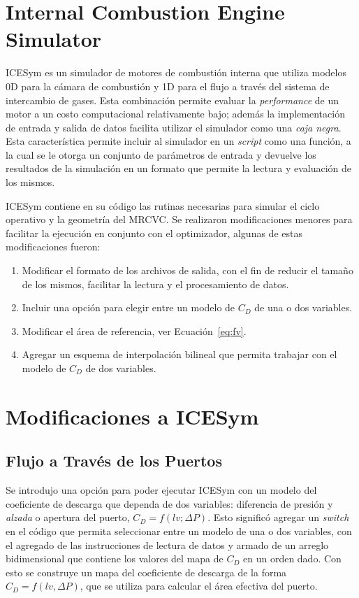 \section{Internal Combustion Engine Simulator}
%
ICESym es un simulador de motores de combustión interna que  utiliza modelos 0D
para la cámara de combustión y 1D para el flujo a través del sistema de
intercambio de gases.
%
Esta combinación permite evaluar la \emph{performance} de un motor a un costo
computacional relativamente bajo; además la implementación de entrada y salida
de datos facilita utilizar el simulador como una \emph{caja negra}.
%
Esta característica permite incluir al simulador en un \emph{script} como una
función, a la cual se le otorga un conjunto de parámetros de entrada y devuelve
los resultados de la simulación en un formato que permite la lectura y
evaluación de los mismos.

ICESym contiene en su código las rutinas necesarias para simular el ciclo
operativo y la geometría del MRCVC.
%
Se realizaron modificaciones menores para facilitar la ejecución en conjunto con
el optimizador, algunas de estas modificaciones fueron:
%
\begin{enumerate}
    \item Modificar el formato de los archivos de salida, con el fin de reducir
el tamaño de los mismos, facilitar la lectura y el procesamiento de datos.
    \item Incluir una opción para elegir entre un modelo de $C_D$ de una o dos
variables.
    \item Modificar el área de referencia, ver Ecuación~\ref{eq:fv}.
    \item Agregar un esquema de interpolación bilineal que permita trabajar con
el modelo de $C_{D}$ de dos variables.
\end{enumerate}


\section{Modificaciones a ICESym}
\subsection{Flujo a Través de los Puertos}
%
Se introdujo una opción para poder ejecutar ICESym con un modelo del coeficiente
de descarga que dependa de dos variables: diferencia de presión y \emph{alzada}
o apertura del puerto, $C_D = f(lv; \Delta P)$.
%
Esto significó agregar un \emph{switch} en el código que permita seleccionar
entre un modelo de una o dos variables, con el agregado de las instrucciones de
lectura de datos y armado de un arreglo bidimensional que contiene los valores
del mapa de $C_{D}$ en un orden dado.
%
Con esto se construye un mapa del coeficiente de descarga de la forma $C_D =
f(lv, \Delta P)$, que se utiliza para calcular el área efectiva del puerto.

